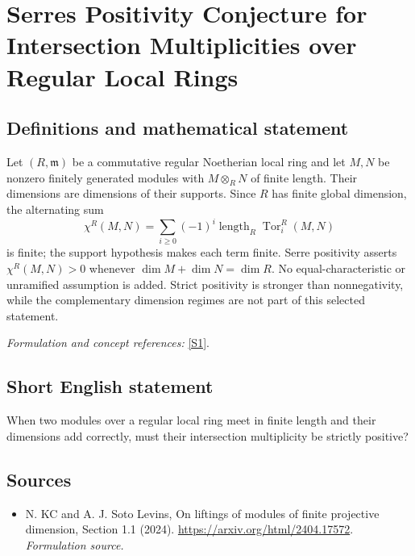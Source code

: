 \documentclass[11pt]{article}
\begin{document}
\section*{\texorpdfstring{Serres Positivity Conjecture for Intersection Multiplicities over Regular Local Rings}{Serres Positivity Conjecture for Intersection Multiplicities over Regular Local Rings}}\label{389}
\subsection{Definitions and mathematical statement}
Let $(R,\mathfrak m)$ be a commutative regular Noetherian local ring and let $M,N$ be nonzero finitely generated modules with $M\otimes_RN$ of finite length. Their dimensions are dimensions of their supports. Since $R$ has finite global dimension, the alternating sum
\[
 \chi^R(M,N)=\sum_{i\ge0}(-1)^i
 \operatorname{length}_R\operatorname{Tor}_i^R(M,N)
\]
is finite; the support hypothesis makes each term finite. Serre positivity asserts $\chi^R(M,N)>0$ whenever $\dim M+\dim N=\dim R$. No equal-characteristic or unramified assumption is added. Strict positivity is stronger than nonnegativity, while the complementary dimension regimes are not part of this selected statement.
\par\smallskip\textit{Formulation and concept references:} \href{https://arxiv.org/html/2404.17572}{[S1]}.

\subsection{Short English statement}
When two modules over a regular local ring meet in finite length and their dimensions add correctly, must their intersection multiplicity be strictly positive?
\subsection{Sources}
\begin{itemize}
\item[S1]N. KC and A. J. Soto Levins, On liftings of modules of finite projective dimension, Section 1.1 (2024).
\url{https://arxiv.org/html/2404.17572}.
\textit{Formulation source.}
\end{itemize}
\end{document}
